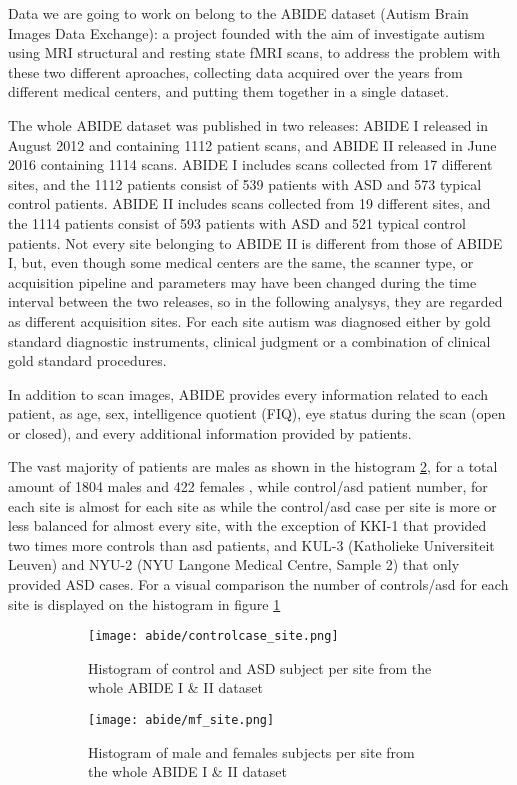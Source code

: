 \documentclass[10pt]{report}
\begin{document}
Data we are going to work on belong to the ABIDE dataset (Autism Brain Images Data Exchange): a project founded with the aim of investigate autism using MRI structural and resting state fMRI scans, to address the problem with these two different aproaches, collecting data acquired over the years from different medical centers, and putting them together in a single dataset.

The whole ABIDE dataset was published in two releases: ABIDE I released in August 2012 and containing 1112 patient scans, and ABIDE II released in June 2016 containing 1114 scans.
ABIDE I includes scans collected from 17 different sites, and the 1112 patients consist of 539 patients with ASD and 573 typical control patients.
ABIDE II includes scans collected from 19 different sites, and the 1114 patients consist of 593 patients with ASD and 521 typical control patients.
Not every site belonging to ABIDE II is different from those of ABIDE I, but, even though some medical centers are the same, the scanner type, or acquisition pipeline and parameters may have been changed during the time interval between the two releases, so in the following analysys, they are regarded as different acquisition sites.
For each site autism was diagnosed either by gold standard diagnostic instruments, clinical judgment or a combination of clinical gold standard procedures.

In addition to scan images, ABIDE provides every information related to each patient, as age, sex, intelligence quotient (FIQ), eye status during the scan (open or closed), and every additional information provided by patients.

The vast majority of patients are males as shown in the histogram \ref{fig:mf_site}, for a total amount of 1804 males and 422 females , while control/asd patient number, for each site is almost  for each site as
while the control/asd case per site is more or less balanced for almost every site, with the exception of KKI-1 that provided two times more controls than asd patients, and KUL-3 (Katholieke Universiteit Leuven) and NYU-2 (NYU Langone Medical Centre, Sample 2) that only provided ASD cases. For a visual comparison the number of controls/asd for each site is displayed on the histogram in figure \ref{fig:controlcase_site}

\begin{figure}[h]
\centering
\begin{subfigure}{0.9\textwidth}
\texttt{[image: abide/controlcase\_site.png]}
\caption{Histogram of control and ASD subject per site from the whole ABIDE I \& II dataset}
\label{fig:controlcase_site}
\end{subfigure}
\begin{subfigure}{0.9\textwidth}
\texttt{[image: abide/mf\_site.png]}
\caption{Histogram of male and females subjects per site from the whole ABIDE I \& II dataset}
\label{fig:mf_site}
\end{subfigure}
\caption{}
\label{}
\end{figure}
\end{document}
